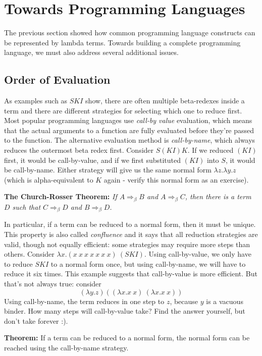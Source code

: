 \section{Towards Programming Languages}

The previous section showed how common programming language constructs can
be represented by lambda terms.  Towards building a complete programming
language, we must also address several additional issues.

\subsection{Order of Evaluation}

As examples such as $SKI$ show, there are often multiple beta-redexes inside a
term and there are different strategies for selecting which one to reduce first.
Most popular programming languages use {\em call-by value\/} evaluation,
which means that the actual arguments to a function are fully evaluated
before they're passed to the function.  The alternative evaluation method
is {\em call-by-name\/}, which always reduces the outermost beta redex
first.  Consider $S(KI)K$.  If we reduced $(KI)$ first, it would be
call-by-value, and if we first substituted $(KI)$ into $S$, it would
be call-by-name.  Either strategy will give us the same normal form
$\lambda z.\lambda y.z$ (which is alpha-equivalent to $K$ again - verify
this normal form as an exercise).

{\flushleft\bf The Church-Rosser Theorem:} {\em If $A\Rightarrow_\beta B$ and
$A\Rightarrow_\beta C$, then there is a term $D$ such that
$C\Rightarrow_\beta D$ and $B\Rightarrow_\beta D$.}

In particular, if a term can be reduced to a normal form, then it must
be unique.  This property is also called {\em confluence\/} and it
says that all reduction strategies are valid, though not equally
efficient: some strategies may require more steps than others.
Consider $\lambda x.(x~x~x~x~x~x~x)~ (SKI)$.  Using call-by-value,
we only have to reduce $SKI$ to a normal form once, but using call-by-name,
we will have to reduce it six times.  This example suggests that call-by-value
is more efficient.  But that's not always true: consider
$$(\lambda y.z) ((\lambda x.x~x)~(\lambda x.x~x))$$  Using call-by-name,
the term reduces in one step to $z$, because $y$ is a vacuous binder.  How
many steps will call-by-value take?  Find the answer yourself, but don't take
forever :).

{\flushleft\bf Theorem: } If a term can be reduced to a normal form, the normal
form can be reached using the call-by-name strategy.

